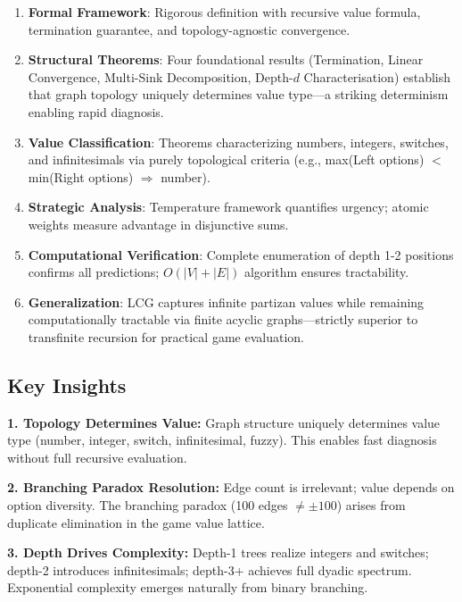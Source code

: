 \documentclass[10pt,a4paper,twocolumn]{article}
\theoremstyle{plain}
\theoremstyle{definition}
\theoremstyle{remark}
\begin{document}
\begin{enumerate}

\item \textbf{Formal Framework}: Rigorous definition with recursive value formula, termination guarantee, and topology-agnostic convergence.

\item \textbf{Structural Theorems}: Four foundational results (Termination, Linear Convergence, Multi-Sink Decomposition, Depth-$d$ Characterisation) establish that graph topology uniquely determines value type—a striking determinism enabling rapid diagnosis.

\item \textbf{Value Classification}: Theorems characterizing numbers, integers, switches, and infinitesimals via purely topological criteria (e.g., max(Left options) $<$ min(Right options) $\Rightarrow$ number).

\item \textbf{Strategic Analysis}: Temperature framework quantifies urgency; atomic weights measure advantage in disjunctive sums.

\item \textbf{Computational Verification}: Complete enumeration of depth 1-2 positions confirms all predictions; $O(|V| + |E|)$ algorithm ensures tractability.

\item \textbf{Generalization}: LCG captures infinite partizan values while remaining computationally tractable via finite acyclic graphs—strictly superior to transfinite recursion for practical game evaluation.

\end{enumerate}

\subsection{Key Insights}

\textbf{1. Topology Determines Value:} Graph structure uniquely determines value type (number, integer, switch, infinitesimal, fuzzy). This enables fast diagnosis without full recursive evaluation.

\textbf{2. Branching Paradox Resolution:} Edge count is irrelevant; value depends on option diversity. The branching paradox (100 edges $\neq \pm 100$) arises from duplicate elimination in the game value lattice.

\textbf{3. Depth Drives Complexity:} Depth-1 trees realize integers and switches; depth-2 introduces infinitesimals; depth-3+ achieves full dyadic spectrum. Exponential complexity emerges naturally from binary branching.
\end{document}
